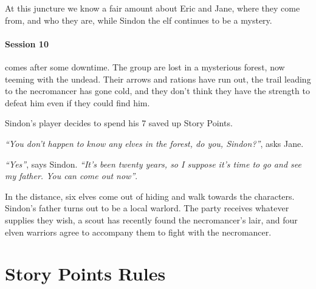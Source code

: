 \begin{multicols}{2}
At this juncture we know a fair amount about Eric and Jane, where they come from, and who they are, while Sindon the elf continues to be a mystery.

\paragraph{Session 10} comes after some downtime.  The group are lost in a mysterious forest, now teeming with the undead.  Their arrows and rations have run out, the trail leading to the necromancer has gone cold, and they don't think they have the strength to defeat him even if they could find him.

Sindon's player decides to spend his 7 saved up Story Points.

\textit{``You don't happen to know any elves in the forest, do you, Sindon?''}, asks Jane.

\textit{``Yes''}, says Sindon.  \textit{``It's been twenty years, so I suppose it's time to go and see my father.  You can come out now''}.

In the distance, six elves come out of hiding and walk towards the characters.  Sindon's father turns out to be a local warlord.  The party receives whatever supplies they wish, a scout has recently found the necromancer's lair, and four elven warriors agree to accompany them to fight with the necromancer.

\end{multicols}

\section{Story Points Rules}

